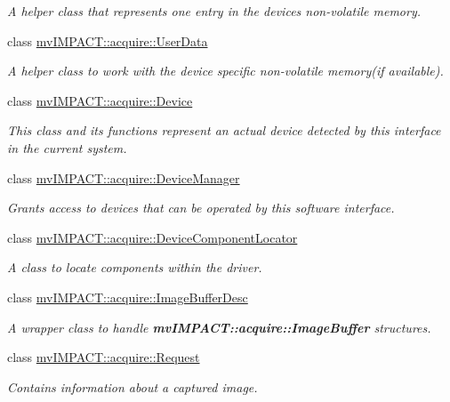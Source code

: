 \begin{DoxyCompactItemize}
\begin{DoxyCompactList}\small\item\em A helper class that represents one entry in the devices non-\/volatile memory. \end{DoxyCompactList}\item 
class \hyperlink{classmv_i_m_p_a_c_t_1_1acquire_1_1_user_data}{mv\+I\+M\+P\+A\+C\+T\+::acquire\+::\+User\+Data}
\begin{DoxyCompactList}\small\item\em A helper class to work with the device specific non-\/volatile memory(if available). \end{DoxyCompactList}\item 
class \hyperlink{classmv_i_m_p_a_c_t_1_1acquire_1_1_device}{mv\+I\+M\+P\+A\+C\+T\+::acquire\+::\+Device}
\begin{DoxyCompactList}\small\item\em This class and its functions represent an actual device detected by this interface in the current system. \end{DoxyCompactList}\item 
class \hyperlink{classmv_i_m_p_a_c_t_1_1acquire_1_1_device_manager}{mv\+I\+M\+P\+A\+C\+T\+::acquire\+::\+Device\+Manager}
\begin{DoxyCompactList}\small\item\em Grants access to devices that can be operated by this software interface. \end{DoxyCompactList}\item 
class \hyperlink{classmv_i_m_p_a_c_t_1_1acquire_1_1_device_component_locator}{mv\+I\+M\+P\+A\+C\+T\+::acquire\+::\+Device\+Component\+Locator}
\begin{DoxyCompactList}\small\item\em A class to locate components within the driver. \end{DoxyCompactList}\item 
class \hyperlink{classmv_i_m_p_a_c_t_1_1acquire_1_1_image_buffer_desc}{mv\+I\+M\+P\+A\+C\+T\+::acquire\+::\+Image\+Buffer\+Desc}
\begin{DoxyCompactList}\small\item\em A wrapper class to handle {\bfseries mv\+I\+M\+P\+A\+C\+T\+::acquire\+::\+Image\+Buffer} structures. \end{DoxyCompactList}\item 
class \hyperlink{classmv_i_m_p_a_c_t_1_1acquire_1_1_request}{mv\+I\+M\+P\+A\+C\+T\+::acquire\+::\+Request}
\begin{DoxyCompactList}\small\item\em Contains information about a captured image. \end{DoxyCompactList}\item 

\end{DoxyCompactItemize}
